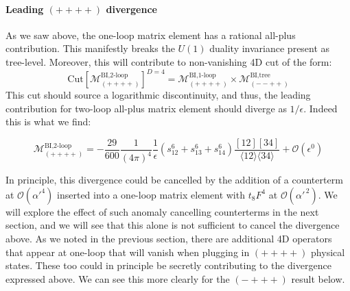 \documentclass[11pt,letter]{article}
\begin{document}
\paragraph{Leading $(++++)$ divergence} As we saw above, the one-loop matrix element has a rational all-plus contribution. This manifestly breaks the $U(1)$ duality invariance present as tree-level. Moreover, this will contribute to non-vanishing 4D cut of the form:
\begin{equation}
\text{Cut}\left[\mathcal{M}^{\text{BI,2-loop}}_{(++++)} \right]^{D=4} = \mathcal{M}^{\text{BI,1-loop}}_{(++++)} \times \mathcal{M}^{\text{BI,tree}}_{(--++)} 
\end{equation}
This cut should source a logarithmic discontinuity, and thus, the leading contribution for two-loop all-plus matrix element should diverge as $1/\epsilon$. Indeed this is what we find:
\begin{eBox}
\begin{equation}
\label{eq:allPlus2}
\mathcal{M}^{\text{BI,2-loop}}_{(++++)} = -\frac{29}{600} \frac{1}{(4\pi)^4}\frac{1}{\epsilon}(s_{12}^6+s_{13}^6+s_{14}^6)\frac{[12][34]}{\langle 12\rangle \langle 34\rangle }+\mathcal{O}(\epsilon^0)
\end{equation}
\end{eBox}
In principle, this divergence could be cancelled by the addition of a counterterm at $\mathcal{O}(\alpha'^4)$ inserted into a one-loop matrix element with $t_8F^4$ at $\mathcal{O}(\alpha'^{\,2})$. We will explore the effect of such anomaly cancelling counterterms in the next section, and we will see that this alone is not sufficient to cancel the divergence above. As we noted in the previous section, there are additional 4D operators that appear at one-loop that will vanish when plugging in $(++++)$ physical states. These too could in principle be secretly contributing to the divergence expressed above. We can see this more clearly for the $(-+++)$ result below. 
\end{document}
